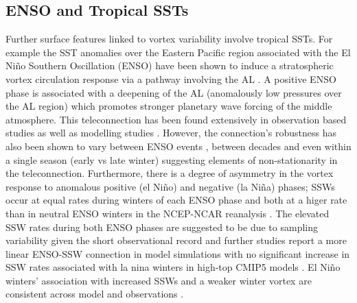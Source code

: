 {\subsection{ENSO and Tropical SSTs}
\label{sec:external_influence_SSTs}
Further surface features linked to vortex variability involve tropical SSTs. For example the SST anomalies over the Eastern Pacific region associated with the El Ni\~{n}o Southern Oscillation (ENSO) have been shown to induce a stratospheric vortex circulation response via a pathway involving the AL \citep{domeisenTeleconnection2019}. A positive ENSO phase is associated with a deepening of the AL (anomalously low pressures over the AL region) which promotes stronger planetary wave forcing of the middle atmosphere. This teleconnection has been found extensively in observation based studies \citep{garfinkelDifferent2008, inesonRole2009, smithLinear2012} as well as modelling studies \citep{bellStratospheric2009, domeisenSeasonal2015, manziniInfluence2006, richterEffects2015}. However, the connection's robustness has also been shown to vary between ENSO events \citep{deserNorthern2017, izaStratospheric2016}, between decades \citep{ayarzaguena2018} and even within a single season (early vs late winter) \citep{ayarzaguenaIntraseasonal2018a} suggesting elements of non-stationarity in the teleconnection. Furthermore, there is a degree of asymmetry in the vortex response to anomalous positive (el Ni\~{n}o) and negative (la Ni\~{n}a) phases; SSWs occur at equal rates during winters of each ENSO phase and both at a higer rate than in neutral ENSO winters in the NCEP-NCAR reanalysis \citep{butlerNino2011, Garfinkel2012whymight}. The elevated SSW rates during both ENSO phases are suggested to be due to sampling variability given the short observational record and further studies report a more linear ENSO-SSW connection in model simulations \citep{polvaniDistinguishing2017} with no significant increase in SSW rates associated with la nina winters in high-top CMIP5 models \citep{songRevisiting2018}. El Ni\~{n}o winters' association with increased SSWs and a weaker winter vortex are consistent across model and observations \citep{manziniInfluence2006, richterEffects2015}. 

}
